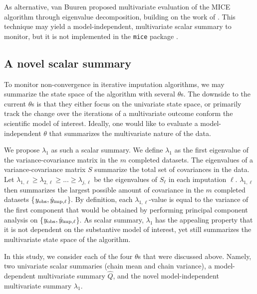 \documentclass[Royal,times,sageh]{sagej}
\begin{document}
As alternative, van Buuren \citeyearpar[\(\S\) 4.5.2]{buur18} proposed multivariate evaluation of the MICE algorithm through eigenvalue decomposition, building on the work of \citet{mack03}. This technique may yield a model-independent, multivariate scalar summary to monitor, but it is not implemented in the \texttt{mice} package \citep{mice}.

\hypertarget{a-novel-scalar-summary}{%
\subsection{A novel scalar summary}\label{a-novel-scalar-summary}}

To monitor non-convergence in iterative imputation algorithms, we may summarize the state space of the algorithm with several \(\theta\)s. The downside to the current \(\theta\)s is that they either focus on the univariate state space, or primarily track the change over the iterations of a multivariate outcome conform the scientific model of interest. Ideally, one would like to evaluate a model-independent \(\theta\) that summarizes the multivariate nature of the data.

We propose \(\lambda_{1}\) as such a scalar summary. We define \(\lambda_{1}\) as the first eigenvalue of the variance-covariance matrix in the \(m\) completed datasets. The eigenvalues of a variance-covariance matrix \(S\) summarize the total set of covariances in the data. Let \(\lambda_{1, \ell} \geq \lambda_{2, \ell} \geq ... \geq \lambda_{j, \ell}\) be the eigenvalues of \(S_\ell\) in each imputation \(\ell\). \(\lambda_{1,\ell}\) then summarizes the largest possible amount of covariance in the \(m\) completed datasets \{\(y_{\rm obs}, \dot y_{\rm imp, \ell}\)\}. By definition, each \(\lambda_{1, \ell}\)-value is equal to the variance of the first component that would be obtained by performing principal component analysis on \{\(y_{\rm obs}, \dot y_{\rm imp, \ell}\)\}. As scalar summary, \(\lambda_{1}\) has the appealing property that it is not dependent on the substantive model of interest, yet still summarizes the multivariate state space of the algorithm. \newline

\noindent In this study, we consider each of the four \(\theta\)s that were discussed above. Namely, two univariate scalar summaries (chain mean and chain variance), a model-dependent multivariate summary \(\hat{Q}\), and the novel model-independent multivariate summary \(\lambda_1\).
\end{document}
